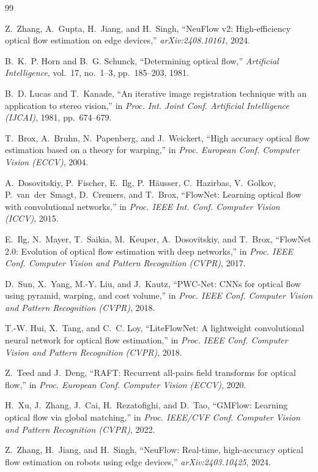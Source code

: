 \documentclass[conference]{IEEEtran}
\begin{document}
\begin{thebibliography}{99}

Z.~Zhang, A.~Gupta, H.~Jiang, and H.~Singh, ``NeuFlow v2: High-efficiency optical
flow estimation on edge devices,'' \emph{arXiv:2408.10161}, 2024.

B.~K.~P. Horn and B.~G. Schunck, ``Determining optical flow,'' \emph{Artificial
Intelligence}, vol.~17, no.~1--3, pp.~185--203, 1981.

B.~D. Lucas and T.~Kanade, ``An iterative image registration technique with an
application to stereo vision,'' in \emph{Proc. Int. Joint Conf. Artificial
Intelligence (IJCAI)}, 1981, pp.~674--679.

T.~Brox, A.~Bruhn, N.~Papenberg, and J.~Weickert, ``High accuracy optical flow
estimation based on a theory for warping,'' in \emph{Proc. European Conf.
Computer Vision (ECCV)}, 2004.

A.~Dosovitskiy, P.~Fischer, E.~Ilg, P.~H\"{a}usser, C.~Hazirbas, V.~Golkov,
P.~van~der~Smagt, D.~Cremers, and T.~Brox, ``FlowNet: Learning optical flow with
convolutional networks,'' in \emph{Proc. IEEE Int. Conf. Computer Vision (ICCV)},
2015.

E.~Ilg, N.~Mayer, T.~Saikia, M.~Keuper, A.~Dosovitskiy, and T.~Brox, ``FlowNet
2.0: Evolution of optical flow estimation with deep networks,'' in \emph{Proc.
IEEE Conf. Computer Vision and Pattern Recognition (CVPR)}, 2017.

D.~Sun, X.~Yang, M.-Y. Liu, and J.~Kautz, ``PWC-Net: CNNs for optical flow using
pyramid, warping, and cost volume,'' in \emph{Proc. IEEE Conf. Computer Vision
and Pattern Recognition (CVPR)}, 2018.

T.-W. Hui, X.~Tang, and C.~C. Loy, ``LiteFlowNet: A lightweight convolutional
neural network for optical flow estimation,'' in \emph{Proc. IEEE Conf. Computer
Vision and Pattern Recognition (CVPR)}, 2018.

Z.~Teed and J.~Deng, ``RAFT: Recurrent all-pairs field transforms for optical
flow,'' in \emph{Proc. European Conf. Computer Vision (ECCV)}, 2020.

H.~Xu, J.~Zhang, J.~Cai, H.~Rezatofighi, and D.~Tao, ``GMFlow: Learning optical
flow via global matching,'' in \emph{Proc. IEEE/CVF Conf. Computer Vision and
Pattern Recognition (CVPR)}, 2022.

Z.~Zhang, H.~Jiang, and H.~Singh, ``NeuFlow: Real-time, high-accuracy optical
flow estimation on robots using edge devices,'' \emph{arXiv:2403.10425}, 2024.


\end{thebibliography}
\end{document}
